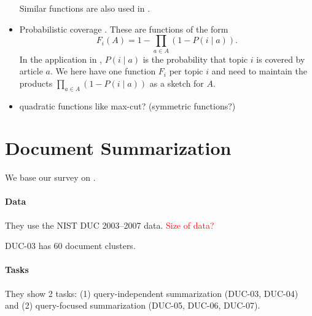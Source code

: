 \documentclass{article}
\newcommand{\red}[1]{\textcolor{red}{#1}}
\begin{document}
\begin{itemize}
\begin{enumerate}
  \end{enumerate}
  Similar functions are also used in \citep{linB11,liu13}.
 \item Probabilistic coverage \citep{yue11}. These are functions of the form
    \begin{equation}
      \label{eq:4}
      F_i(A) = 1 - \prod_{a \in A}(1-P(i\mid a)).
    \end{equation}
    In the application in \citep{yue11}, $P(i \mid a)$ is the probability that topic $i$ is covered by article $a$. We here have one function $F_i$ per topic $i$ and need to maintain the products $\prod_{a \in A}(1-P(i\mid a))$ as a sketch for $A$.
\item quadratic functions like max-cut? (symmetric functions?)
\end{itemize}


\section{Document Summarization}

We base our survey on \citep{linB12learning}. 

\paragraph{Data} They use the NIST DUC 2003--2007 data. \red{Size of data?}

DUC-03 has 60 document clusters.


\paragraph{Tasks} They show 2 tasks: (1) query-independent summarization (DUC-03, DUC-04) and (2) query-focused summarization (DUC-05, DUC-06, DUC-07). 
\end{document}
